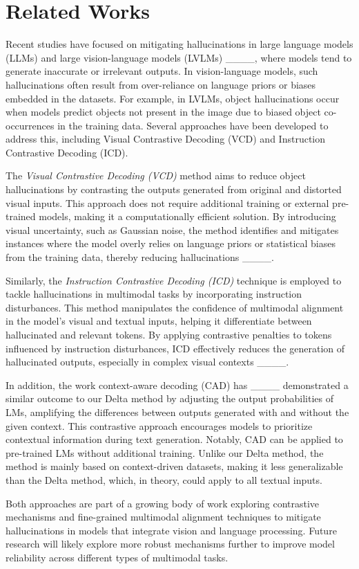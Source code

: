 \section{Related Works}
Recent studies have focused on mitigating hallucinations in large language models (LLMs) and large vision-language models (LVLMs) ____, where models tend to generate inaccurate or irrelevant outputs. In vision-language models, such hallucinations often result from over-reliance on language priors or biases embedded in the datasets. For example, in LVLMs, object hallucinations occur when models predict objects not present in the image due to biased object co-occurrences in the training data. Several approaches have been developed to address this, including Visual Contrastive Decoding (VCD) and Instruction Contrastive Decoding (ICD).

The \textit{Visual Contrastive Decoding (VCD)} method aims to reduce object hallucinations by contrasting the outputs generated from original and distorted visual inputs. This approach does not require additional training or external pre-trained models, making it a computationally efficient solution. By introducing visual uncertainty, such as Gaussian noise, the method identifies and mitigates instances where the model overly relies on language priors or statistical biases from the training data, thereby reducing hallucinations ____.

Similarly, the \textit{Instruction Contrastive Decoding (ICD)} technique is employed to tackle hallucinations in multimodal tasks by incorporating instruction disturbances. This method manipulates the confidence of multimodal alignment in the model's visual and textual inputs, helping it differentiate between hallucinated and relevant tokens. By applying contrastive penalties to tokens influenced by instruction disturbances, ICD effectively reduces the generation of hallucinated outputs, especially in complex visual contexts ____.

In addition, the work context-aware decoding (CAD) has ____ demonstrated a similar outcome to our Delta method by adjusting the output probabilities of LMs, amplifying the differences between outputs generated with and without the given context. This contrastive approach encourages models to prioritize contextual information during text generation. Notably, CAD can be applied to pre-trained LMs without additional training. Unlike our Delta method, the method is mainly based on context-driven datasets, making it less generalizable than the Delta method, which, in theory, could apply to all textual inputs.

Both approaches are part of a growing body of work exploring contrastive mechanisms and fine-grained multimodal alignment techniques to mitigate hallucinations in models that integrate vision and language processing. Future research will likely explore more robust mechanisms further to improve model reliability across different types of multimodal tasks.